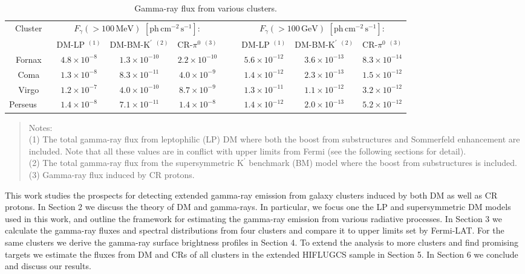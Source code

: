 \documentclass[10pt,aps,pra,reprint,amsmath,amsfonts,amssymb,showpacs,nofootinbib,floatfix]{revtex4-1}
\newcommand{\rmn}{\mathrm}
\newcommand{\Kp}{\rmn{K}^\prime}
\begin{document}
\begin{table}
\begin{minipage}{2.0\columnwidth}
  \caption{Gamma-ray flux from various clusters.}
\begin{tabular}{c  c c c  c  c c c}
\hline
\hline
 Cluster &
\multicolumn{3}{c}{$F_{\gamma}(>100\,\rmn{MeV})$ $[\rmn{ph}\,\rmn{cm}^{-2}\,\rmn{s}^{-1}]$:} & &
\multicolumn{3}{c}{$F_{\gamma}(>100\,\rmn{GeV})$ $[\rmn{ph}\,\rmn{cm}^{-2}\,\rmn{s}^{-1}]$:} \\
         & DM-LP $^{(1)}$ & DM-BM-$\Kp$ $^{(2)}$ & CR-$\pi^0$ $^{(3)}$ 
         & & DM-LP $^{(1)}$ & DM-BM-$\Kp$ $^{(2)}$ & CR-$\pi^0$ $^{(3)}$ \\
 \hline
Fornax               & $4.8\times10^{-8}$ & $1.3\times10^{-10}$ &  $2.2\times10^{-10}$ 
& \,\,\,\,\, & $5.6\times10^{-12}$  & $3.6\times10^{-13}$ & $8.3\times10^{-14}$ \\
Coma                 & $1.3\times10^{-8}$ & $8.3\times10^{-11}$ &  $4.0\times10^{-9}$  
& \,\,\,\,\, & $1.4\times10^{-12}$  & $2.3\times10^{-13}$ & $1.5\times10^{-12}$ \\
Virgo                & $1.2\times10^{-7}$ & $4.0\times10^{-10}$ &  $8.7\times10^{-9}$  
& \,\,\,\,\, & $1.3\times10^{-11}$  & $1.1\times10^{-12}$ & $3.2\times10^{-12}$ \\
Perseus \,\,\,\,\,\, & $1.4\times10^{-8}$ & $7.1\times10^{-11}$ &  $1.4\times10^{-8}$  
& \,\,\,\,\, & $1.4\times10^{-12}$  & $2.0\times10^{-13}$ & $5.2\times10^{-12}$ \\
\hline
\hline
\end{tabular}
\begin{quote}
  Notes: \\
  (1) The total gamma-ray flux from leptophilic (LP) DM where both the
  boost from substructures and Sommerfeld enhancement are
  included. Note that all these values are in conflict with upper limits from
  Fermi (see the following sections for detail).\\
 (2) The total gamma-ray flux from the supersymmetric $\Kp$ benchmark (BM) 
 model where the boost from substructures is included.\\
 (3) Gamma-ray flux induced by CR protons.
 \label{tab:flux_tab}
  \end{quote}
\end{minipage}
\end{table} 

This work studies the prospects for detecting extended gamma-ray
emission from galaxy clusters induced by both DM as well as CR
protons. In Section 2 we discuss the theory of DM and gamma-rays. In
particular, we focus one the LP and supersymmetric DM models
used in this work, and outline the framework for estimating the
gamma-ray emission from various radiative processes. In Section 3
we calculate the gamma-ray fluxes and spectral distributions from four
clusters and compare it to upper limits set by Fermi-LAT. For the same
clusters we derive the gamma-ray surface brightness profiles in
Section 4. To extend the analysis to more clusters and find
promising targets we estimate the fluxes from DM and CRs of all
clusters in the extended HIFLUGCS sample in Section 5. In Section
6 we conclude and discuss our results.
\end{document}
